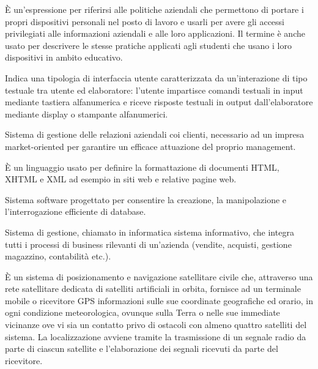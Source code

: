\begin{acronym}[HTML5]
	
	{\small È un'espressione per riferirsi alle politiche aziendali che permettono di portare i propri dispositivi personali nel posto di lavoro e usarli per avere gli accessi privilegiati alle informazioni aziendali e alle loro applicazioni. Il termine è anche usato per descrivere le stesse pratiche applicati agli studenti che usano i loro dispositivi in ambito educativo. \par}

	
	{\small Indica una tipologia di interfaccia utente caratterizzata da un'interazione di tipo testuale tra utente ed elaboratore: l'utente impartisce comandi testuali in input mediante tastiera alfanumerica e riceve risposte testuali in output dall'elaboratore mediante display o stampante alfanumerici. \par}
	
	
	{\small Sistema di gestione delle relazioni aziendali coi clienti, necessario ad un impresa market-oriented per garantire un efficace attuazione del proprio management. \par}
	
	
	{\small È un linguaggio usato per definire la formattazione di documenti HTML, XHTML e XML ad esempio in siti web e relative pagine web. \par}
	
	
	{\small  Sistema software progettato per consentire la creazione, la manipolazione e l'interrogazione efficiente  di database. \par}

	
	{\small Sistema di gestione, chiamato in informatica sistema informativo, che integra tutti i processi di business rilevanti di un'azienda (vendite, acquisti, gestione magazzino, contabilità etc.). \par}
	
	
	{\small È un sistema di posizionamento e navigazione satellitare civile che, attraverso una rete satellitare dedicata di satelliti artificiali in orbita, fornisce ad un terminale mobile o ricevitore GPS informazioni sulle sue coordinate geografiche ed orario, in ogni condizione meteorologica, ovunque sulla Terra o nelle sue immediate vicinanze ove vi sia un contatto privo di ostacoli con almeno quattro satelliti del sistema. La localizzazione avviene tramite la trasmissione di un segnale radio da parte di ciascun satellite e l'elaborazione dei segnali ricevuti da parte del ricevitore. \par}


\end{acronym}
